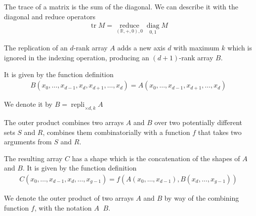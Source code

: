 \documentclass{DIKU-report-variant}
\newcommand\mrm[1]{\mathrm{#1}}
\newcommand\brm[1]{\bm{\mrm{#1}}}
\newcommand\Real{\mathbb{R}}
\newcommand\reduce{\operatorname*{\brm{reduce}}}
\newcommand\diag{\operatorname*{\brm{diag}}}
\newcommand\repli{\operatorname*{\brm{repli}}}
\newcommand\oprodby[1]{\mathop{\coprod_{#1}}}
\begin{document}
\begin{example}
  \label{ex:trace}
  The trace of a matrix is the sum of the diagonal. We can describe it with the diagonal
  and reduce operators
  \begin{align*}
    \operatorname*{\brm{tr}} M = \reduce_{(\Real,+,0),0} \diag_{0,1} M
  \end{align*}
\end{example}

\begin{definition}
  \label{def:replication}
  The replication of an \(d\)-rank array \(A\) adds a new axis \(d\) with maximum \(k\)
  which is ignored in the indexing operation, producing an \((d+1)\)-rank array \(B\).

  It is given by the function definition
  \begin{align*}
    B(x_0, \dots, x_{d-1}, x_d, x_{d+1}, \dots, x_{d}) = A(x_0, \dots, x_{d-1}, x_{d+1}, \dots, x_d)
  \end{align*}

  We denote it by \(B = \repli_{\times d, k} A\)
\end{definition}

\begin{definition}
  \label{def:outer-product}
  The outer product combines two arrays \(A\) and \(B\) over
  two potentially different sets \(S\) and \(R\), combines
  them combinatorially with a function \(f\) that takes two
  arguments from \(S\) and \(R\).

  The resulting array \(C\) has a shape which is the concatenation
  of the shapes of \(A\) and \(B\). It is given by the function definition
  \begin{align*}
    C(x_0,\dots,x_{d-1},x_d,\dots,x_{g-1}) = f(A(x_0,\dots,x_{d-1}), B(x_d,\dots,x_{g-1}))
  \end{align*}

  We denote the outer product of two arrays \(A\) and \(B\) by way of the combining
  function \(f\), with the notation \(A \oprodby f B\).
\end{definition}
\end{document}
